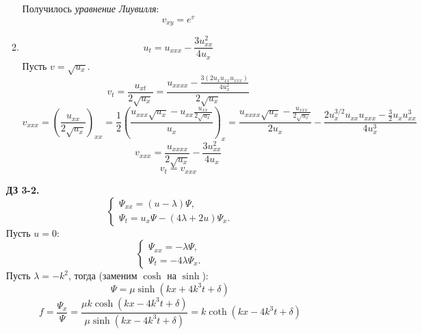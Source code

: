 \documentclass[12pt]{article}
\theoremstyle{definition}
\begin{document}
\begin{itemize}
\begin{enumerate}
\begin{equation}
    \end{equation}
    Получилось \textit{уравнение Лиувилля}:
    \begin{equation}
        \boxed{v_{xy}=e^v}
    \end{equation}
    \item
    \begin{equation}
        u_t=u_{xxx}-\frac{3u_{xx}^2}{4u_x}
    \end{equation}
    Пусть $v=\sqrt{u_x}$.
    \begin{equation}
        v_t=\frac{u_{xt}}{2\sqrt{u_x}}=\frac{u_{xxxx}-\frac{3(2u_xu_{xx}u_{xxx})}{4u_x^2}}{2\sqrt{u_x}}
    \end{equation}
    \begin{equation*}
        v_{xxx}=\left(\frac{u_{xx}}{2\sqrt{u_x}}\right)_{xx}=\frac{1}{2}\left(\frac{u_{xxx}\sqrt{u_x}-u_{xx}\frac{u_{xx}}{2\sqrt{u_x}}}{u_x}\right)_x=\frac{u_{xxxx}\sqrt{u_x}-\frac{u_{xxx}}{2\sqrt{u_x}}}{2u_x}-\frac{2u_x^{3/2}u_{xx}u_{xxx}-\frac{3}{2}u_xu_{xx}^3}{4u_x^3}
    \end{equation*}
    \begin{equation}
        v_{xxx}=\frac{u_{xxxx}}{2\sqrt{u_x}}-\frac{3u_{xx}^2}{4u_x}
    \end{equation}
    \begin{equation}
        \boxed{v_t=v_{xxx}}
    \end{equation}
\end{enumerate}
\item[\textbf{ДЗ 3-2.}]
\begin{equation}
    \left\{
\begin{array}{l}
\Psi_{xx}=(u-\lambda)\Psi,\\
\Psi_t=u_x\Psi-(4\lambda+2u)\Psi_x.
\end{array}
\right.
\end{equation}
Пусть $u=0$:
\begin{equation}\label{eq3}
    \left\{
\begin{array}{l}
\Psi_{xx}=-\lambda\Psi,\\
\Psi_t=-4\lambda\Psi_x.
\end{array}
\right.
\end{equation}
Пусть $\lambda=-k^2$, тогда (заменим $\cosh$ на $\sinh$):  
\begin{equation}
    \Psi=\mu\sinh(kx+4k^3t+\delta)
\end{equation}
\begin{equation}
    f=\frac{\Psi_x}{\Psi}=\frac{\mu k\cosh(kx-4k^3t+\delta)}{\mu\sinh(kx-4k^3t+\delta)}=k\coth(kx-4k^3t+\delta)

\end{equation}
\end{itemize}
\end{document}
